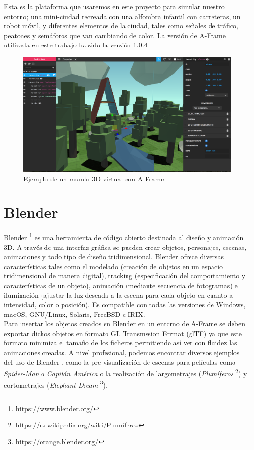 \documentclass{report}
\begin{document}
Esta es la plataforma que usaremos en este proyecto para simular nuestro entorno; una mini-ciudad recreada con una alfombra infantil con carreteras, un robot móvil, y diferentes elementos de la ciudad, tales como señales de tráfico, peatones y semáforos que van cambiando de color. La versión de A-Frame utilizada en este trabajo ha sido la versión 1.0.4

\renewcommand{\figurename}{Figura}		
\begin{figure}[h]
	\centering
	 \includegraphics[scale=0.17]{images/a-frame.png}
	 \caption{Ejemplo de un mundo 3D virtual con A-Frame}
\end{figure}

\section{Blender}
Blender \footnote{https://www.blender.org/} \cite{Blender} es una herramienta de código abierto destinada al diseño y animación 3D. A través de una interfaz gráfica se pueden crear objetos, personajes, escenas, animaciones y todo tipo de diseño tridimensional. Blender ofrece diversas características tales como el modelado (creación de objetos en un espacio tridimensional de manera digital), tracking (especificación del comportamiento y características de un objeto), animación (mediante secuencia de fotogramas) e iluminación (ajustar la luz deseada a la escena para cada objeto en cuanto a intensidad, color o posición). Es compatible con todas las versiones de Windows, macOS, GNU/Linux, Solaris, FreeBSD e IRIX.
\\

Para insertar los objetos creados en Blender en un entorno de A-Frame se deben exportar dichos objetos en formato GL Transmssion Format (glTF) ya que este formato minimiza el tamaño de los ficheros permitiendo así ver con fluidez las animaciones creadas. A nivel profesional, podemos encontrar diversos ejemplos del uso de Blender , como la pre-visualización de escenas para películas como \textit{Spider-Man} o \textit{Capitán América }o la realización de largometrajes (\textit{Plumíferos} \footnote{https://es.wikipedia.org/wiki/Plumíferos}) y cortometrajes (\textit{Elephant Dream} \footnote{https://orange.blender.org/}).
\\
\end{document}
